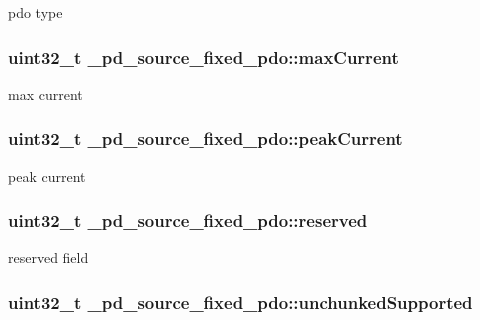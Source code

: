 pdo type \hypertarget{struct__pd__source__fixed__pdo_a1bb1756a3f7fe82e0395efac18eb8f41}{
\subsubsection[{max\-Current}]{\setlength{\rightskip}{0pt plus 5cm}uint32\-\_\-t \-\_\-pd\-\_\-source\-\_\-fixed\-\_\-pdo\-::max\-Current}}\label{struct__pd__source__fixed__pdo_a1bb1756a3f7fe82e0395efac18eb8f41}
max current \hypertarget{struct__pd__source__fixed__pdo_a1a27fc2753ab60196afd3813e158d413}{
\subsubsection[{peak\-Current}]{\setlength{\rightskip}{0pt plus 5cm}uint32\-\_\-t \-\_\-pd\-\_\-source\-\_\-fixed\-\_\-pdo\-::peak\-Current}}\label{struct__pd__source__fixed__pdo_a1a27fc2753ab60196afd3813e158d413}
peak current \hypertarget{struct__pd__source__fixed__pdo_a804529193e9d8df5aec299308e357ea1}{
\subsubsection[{reserved}]{\setlength{\rightskip}{0pt plus 5cm}uint32\-\_\-t \-\_\-pd\-\_\-source\-\_\-fixed\-\_\-pdo\-::reserved}}\label{struct__pd__source__fixed__pdo_a804529193e9d8df5aec299308e357ea1}
reserved field \hypertarget{struct__pd__source__fixed__pdo_a6e793acf2c695c57030e59f28dc5b65a}{
\subsubsection[{unchunked\-Supported}]{\setlength{\rightskip}{0pt plus 5cm}uint32\-\_\-t \-\_\-pd\-\_\-source\-\_\-fixed\-\_\-pdo\-::unchunked\-Supported}}\label{struct__pd__source__fixed__pdo_a6e793acf2c695c57030e59f28dc5b65a}
